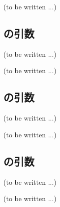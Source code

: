 \clearpage
(to be written ...)


\subsection{\MXIWidth の引数\TBW}
(to be written ...)



\clearpage
(to be written ...)


\subsection{\MYIWidth の引数\TBW}
(to be written ...)



\clearpage
(to be written ...)


\subsection{\MXIface の引数\TBW}
(to be written ...)



\clearpage
(to be written ...)



